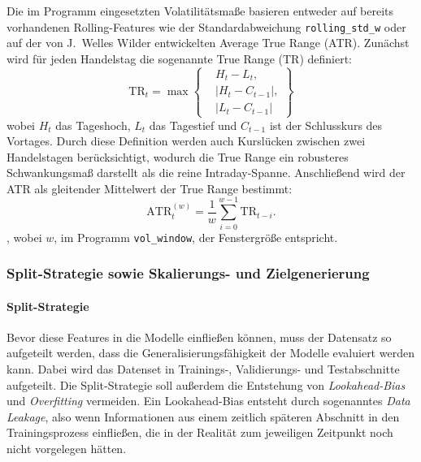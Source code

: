 Die im Programm eingesetzten Volatilitätsmaße basieren entweder auf bereits vorhandenen Rolling-Features wie der Standardabweichung \texttt{rolling\_std\_w} oder auf der von J.~Welles Wilder entwickelten Average True Range (ATR). Zunächst wird für jeden Handelstag die sogenannte True Range (TR) definiert:
\begin{equation}
  \text{TR}_t = \max \left\{
  \begin{aligned}
    & H_t - L_t, \\
    & |H_t - C_{t-1}|, \\
    & |L_t - C_{t-1}|
  \end{aligned}
  \right\}
\end{equation}
wobei $H_t$ das Tageshoch, $L_t$ das Tagestief und
$C_{t-1}$ ist der Schlusskurs des Vortages. \cite[S.~21]{wilder_new_1978} Durch diese Definition werden auch Kurslücken zwischen zwei Handelstagen berücksichtigt, wodurch die True Range ein robusteres Schwankungsmaß darstellt als die reine Intraday-Spanne. Anschließend wird der ATR als gleitender Mittelwert der True Range bestimmt:
\begin{equation}
  \mathrm{ATR}_t^{(w)} = \frac{1}{w}\sum_{i=0}^{w-1}\mathrm{TR}_{t-i}.
\end{equation}
\cite[S.~23]{wilder_new_1978}, wobei $w$, im Programm \texttt{vol\_window}, der Fenstergröße entspricht.

\subsubsection{Split-Strategie sowie Skalierungs- und Zielgenerierung}

\paragraph{Split-Strategie}
Bevor diese Features in die Modelle einfließen können, muss der Datensatz so aufgeteilt werden, dass die Generalisierungsfähigkeit der Modelle evaluiert werden kann. Dabei wird das Datenset in Trainings-, Validierungs- und Testabschnitte aufgeteilt. Die Split-Strategie soll außerdem die Entstehung von \textit{Lookahead-Bias} und \textit{Overfitting} vermeiden. Ein Lookahead-Bias entsteht durch sogenanntes \textit{Data Leakage}, also wenn Informationen aus einem zeitlich späteren Abschnitt in den Trainingsprozess einfließen, die in der Realität zum jeweiligen Zeitpunkt noch nicht vorgelegen hätten. \cite[S.~222]{tesl}

